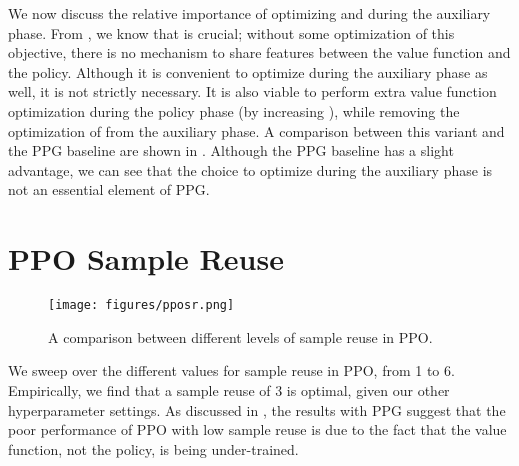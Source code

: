 \documentclass{article}
\begin{document}
We now discuss the relative importance of optimizing  and  during the auxiliary phase. From , we know that  is crucial; without some optimization of this objective, there is no mechanism to share features between the value function and the policy. Although it is convenient to optimize  during the auxiliary phase as well, it is not strictly necessary. It is also viable to perform extra value function optimization during the policy phase (by increasing ), while removing the optimization of  from the auxiliary phase. A comparison between this variant and the PPG baseline are shown in . Although the PPG baseline has a slight advantage, we can see that the choice to optimize  during the auxiliary phase is not an essential element of PPG.

\newpage
\section{PPO Sample Reuse} \label{appendix:ppo_sample_reuse}

\begin{figure*}[h]
\centering
\texttt{[image: figures/pposr.png]}
\caption{A comparison between different levels of sample reuse in PPO.}
\label{fig:pposr}
\end{figure*}

We sweep over the different values for sample reuse in PPO, from 1 to 6. Empirically, we find that a sample reuse of 3 is optimal, given our other hyperparameter settings. As discussed in , the results with PPG suggest that the poor performance of PPO with low sample reuse is due to the fact that the value function, not the policy, is being under-trained.
\end{document}
